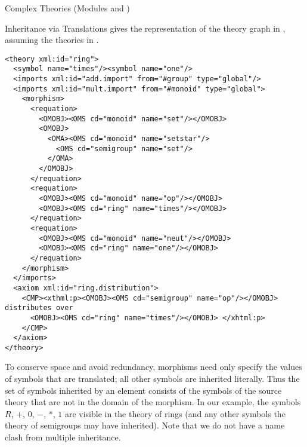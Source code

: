 \begin{tchapter}[id=complex-theories,short=Complex Theories]{Complex Theories (Modules
    {} and {})}
\begin{tsection}[id=morphisms]{Inheritance via Translations}
{} gives the {\omdoc} representation of the theory graph in
{}, assuming the theories in {}.

\begin{lstlisting}[label=lst:rings,
  caption={A Theory of Rings by Inheritance Via Renaming},
  index={derive,method,premise}]
<theory xml:id="ring"> 
  <symbol name="times"/><symbol name="one"/> 
  <imports xml:id="add.import" from="#group" type="global"/>
  <imports xml:id="mult.import" from="#monoid" type="global"> 
    <morphism> 
      <requation> 
        <OMOBJ><OMS cd="monoid" name="set"/></OMOBJ>
        <OMOBJ>
          <OMA><OMS cd="monoid" name="setstar"/>
            <OMS cd="semigroup" name="set"/>
          </OMA>
        </OMOBJ>
      </requation> 
      <requation> 
        <OMOBJ><OMS cd="monoid" name="op"/></OMOBJ>
        <OMOBJ><OMS cd="ring" name="times"/></OMOBJ>
      </requation> 
      <requation>
        <OMOBJ><OMS cd="monoid" name="neut"/></OMOBJ>
        <OMOBJ><OMS cd="ring" name="one"/></OMOBJ>
      </requation> 
    </morphism> 
  </imports> 
  <axiom xml:id="ring.distribution"> 
    <CMP><xthml:p><OMOBJ><OMS cd="semigroup" name="op"/></OMOBJ> distributes over 
      <OMOBJ><OMS cd="ring" name="times"/></OMOBJ> </xhtml:p>
    </CMP> 
  </axiom>
</theory>
\end{lstlisting}

To conserve space and avoid redundancy, {\omdoc} morphisms need only specify the values of
symbols that are translated; all other symbols are inherited literally.  Thus the set of
symbols inherited by an {} element consists of the symbols of the source
theory that are not in the domain of the morphism. In our example, the symbols $R$, $+$,
$0$, $-$, $*$, $1$ are visible in the theory of rings (and any other symbols the theory of
semigroups may have inherited). Note that we do not have a name clash from multiple
inheritance.
  

\end{tsection}
\end{tchapter}

